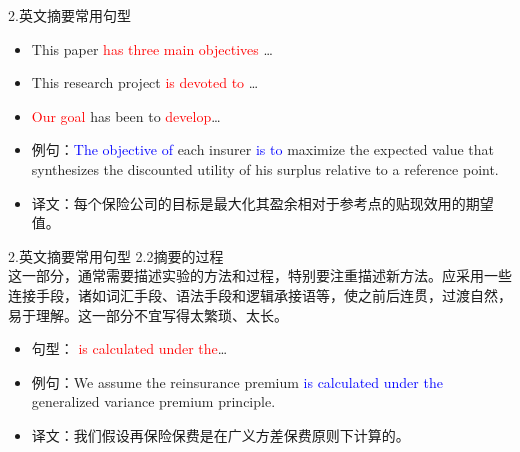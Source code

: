 \documentclass[13pt]{ctexbeamer}
\newcommand{\red}[1]{\textcolor{red}{#1}}
\newcommand{\blue}[1]{\textcolor{blue}{#1}}
\begin{document}
\begin{frame}{2.英文摘要常用句型}


    \renewcommand{\baselinestretch}{1.3}

    \begin{itemize}

        \item
        This paper \red{has three main objectives} …
        \item
        This research project \red{is devoted to} …
        \item \red{Our goal} has been to \red{develop}…
        \item 例句：\blue{The objective of }each insurer \blue{is to } maximize the expected value that synthesizes the discounted utility of his surplus relative to a reference point.
        \item 译文：每个保险公司的目标是最大化其盈余相对于参考点的贴现效用的期望值。
    \end{itemize}

    \vspace{15pt}

\end{frame}
\begin{frame}{2.英文摘要常用句型}
    2.2摘要的过程
    \\
    \renewcommand{\baselinestretch}{1.3}
    这一部分，通常需要描述实验的方法和过程，特别要注重描述新方法。应采用一些连接手段，诸如词汇手段、语法手段和逻辑承接语等，使之前后连贯，过渡自然，易于理解。这一部分不宜写得太繁琐、太长。
    \begin{itemize}
        \item
        句型： \red{is calculated under the}…
        \item
        例句：We assume the reinsurance premium \blue{is calculated under the} generalized variance premium principle.
        \item
        译文：我们假设再保险保费是在广义方差保费原则下计算的。

    \end{itemize}

    \vspace{15pt}

\end{frame}
\end{document}
